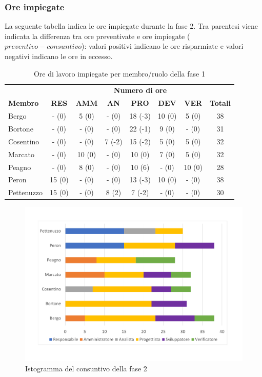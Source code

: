 	\subsubsection{Ore impiegate}
La seguente tabella indica le ore impiegate durante la fase 2. Tra parentesi viene indicata la differenza tra ore preventivate e ore impiegate ($preventivo - consuntivo$): valori positivi indicano le ore risparmiate e valori negativi indicano le ore in eccesso.

		\begin{table}[H]
			\centering
		\begin{tabular}{| l | c c c c c c | c |}
			\rowcolor{LightBlue}
			& \multicolumn{7}{c}{\textbf{\color{white}Numero di ore}}	\\
	
			\rowcolor{LightBlue}
			\textbf{\color{white}Membro}
			& \textbf{\color{white}RES}
			& \textbf{\color{white}AMM}
			& \textbf{\color{white}AN}
			& \textbf{\color{white}PRO}
			& \textbf{\color{white}DEV}
			& \textbf{\color{white}VER}
			& \textbf{\color{white}Totali}\\
			Bergo     		& -  (0)		& 5  (0) 	& -  (0) 		& 18 (-3) & 10 (0) & 5  (0) 	& 38\\
			Bortone   		& -  (0)		& -  (0) 	& -  (0) 		& 22 (-1) & 9 (0) & -  (0)	& 31\\
			Cosentino 		& -  (0)	 	& -  (0) 	& 7  (-2) 		& 15 (-2) & 5 (0) & 5  (0)	& 32\\
			Marcato   		& -  (0) 		& 10  (0) 	& -  (0) 		& 10 (0) & 7 (0) & 5  (0)	& 32\\
			Peagno    		& -  (0) 		& 8  (0) 	& -  (0) 		& 10 (6) & - (0) & 10  (0)	& 28\\
			Peron     		& 15  (0)		& -  (0) 	& -  (0) 		& 13 (-3) & 10 (0) & -  (0)	& 38\\
			Pettenuzzo 		& 15  (0) 		& -  (0) 	& 8  (2) 		& 7 (-2) & - (0) & -  (0)	& 30\\ \hline
		\end{tabular}
		\caption{Ore di lavoro impiegate per membro/ruolo della fase 1}
	\end{table}
	
	\begin{figure}[H]
		\centering
		\includegraphics[scale=0.45]{images/consuntivoRP.pdf}
		\caption{Istogramma del consuntivo della fase 2}
	\end{figure}
	
